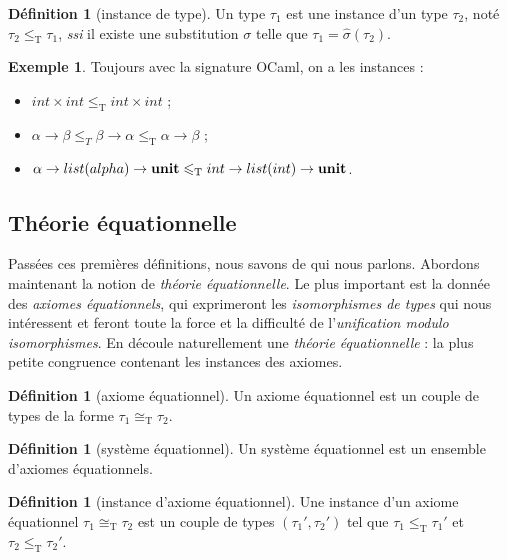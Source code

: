 \documentclass[a4paper]{report}
\theoremstyle{definition}
\newtheorem{definition}[theoreme]{Définition}
\newtheorem{exemple}[theoreme]{Exemple}
\newcommand{\ssi}{\textit{ssi}\xspace}
\newcommand{\unit}{\bold{unit}}
\newcommand{\T}{\mathrm{T}}
\begin{document}
\begin{definition}[instance de type]
  Un type $\tau_1$ est une instance d'un type $\tau_2$, noté $\tau_2 \leqslant_\T \tau_1$, \ssi il existe une substitution $\sigma$ telle que $\tau_1 = \hat\sigma (\tau_2)$.
\end{definition}

\begin{exemple}
  Toujours avec la signature OCaml, on a les instances :
  \begin{itemize}
    \item $int \times int \leqslant_\T int \times int$ ;
    \item $\alpha \rightarrow \beta \leqslant_T \beta \rightarrow \alpha \leqslant_\T \alpha \rightarrow \beta$ ;
    \item $\alpha \rightarrow list (alpha) \rightarrow \unit \leqslant_\T int \rightarrow list (int) \rightarrow \unit$.
  \end{itemize}
\end{exemple}


\subsection{Théorie équationnelle}

Passées ces premières définitions, nous savons de qui nous parlons. Abordons maintenant la notion de \emph{théorie équationnelle}. Le plus important est la donnée des \emph{axiomes équationnels}, qui exprimeront les \emph{isomorphismes de types} qui nous intéressent et feront toute la force et la difficulté de l'\emph{unification modulo isomorphismes}. En découle naturellement une \emph{théorie équationnelle} : la plus petite congruence contenant les instances des axiomes.

\begin{definition}[axiome équationnel]
  Un axiome équationnel est un couple de types de la forme $\tau_1 \cong_\T \tau_2$.
\end{definition}

\begin{definition}[système équationnel]
  Un système équationnel est un ensemble d'axiomes équationnels.
\end{definition}

\begin{definition}[instance d'axiome équationnel]
  Une instance d'un axiome équationnel $\tau_1 \cong_\T \tau_2$ est un couple de types $(\tau_1', \tau_2')$ tel que $\tau_1 \leqslant_\T \tau_1'$ et $\tau_2 \leqslant_\T \tau_2'$.
\end{definition}
\end{document}
